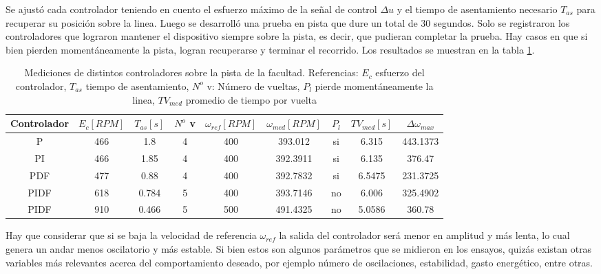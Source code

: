 \documentclass[10pt,conference,a4paper,onecolumn]{article}%
\begin{document}
Se ajustó cada controlador teniendo en cuento el esfuerzo máximo de la señal de control $\Delta u $ y el tiempo de asentamiento necesario $T_{as}$ para recuperar su posición sobre la linea. Luego se desarrolló una prueba en pista que dure un total de 30 segundos. Solo se registraron los controladores que lograron mantener el dispositivo siempre sobre la pista, es decir, que pudieran completar la prueba. Hay casos en que si bien pierden momentáneamente la pista, logran recuperarse y terminar el recorrido. Los resultados se muestran en la tabla \ref{tabla:mediciones}.   
\begin{table}[h]
\begin{center}
\begin{tabular}{|c|c|c|c|c|c|c|c|c|}
\hline
Controlador & $E_c [RPM]$ & $T_{as}[s]$ & $N^o$ v &$\omega_{ref}[RPM]$& $\omega_{med}[RPM]$ & $P_l$ & $TV_{med}[s]$ &$\Delta\omega _{max} $  \\
\hline \hline
P&466&1.8&4&400&393.012&si&6.315&443.1373\\ \hline
PI&466&1.85&4&400&392.3911&si&6.135&376.47\\ \hline
PDF&477&0.88&4&400&392.7832&si&6.5475&231.3725\\ \hline
PIDF&618&0.784&5&400&393.7146&no&6.006&325.4902\\ \hline
PIDF&910&0.466&5&500&491.4325&no&5.0586&360.78\\ \hline

\end{tabular}
\caption{Mediciones de distintos controladores sobre la pista de la facultad. Referencias: $E_c$ esfuerzo del controlador, $T_{as}$ tiempo de asentamiento, $N^o$ v: Número de vueltas, $P_l$ pierde momentáneamente la linea, $TV_{med}$ promedio de tiempo por vuelta}
\label{tabla:mediciones}
\end{center}
\end{table}


Hay que considerar que si se baja la velocidad de referencia $\omega_{ref}$ la salida del controlador será menor en amplitud y más lenta, lo cual genera un andar menos oscilatorio y más estable. 
Si bien estos son algunos parámetros que se midieron en los ensayos, quizás existan otras variables más relevantes acerca del comportamiento deseado, por ejemplo número de oscilaciones, estabilidad, gasto energético, entre otras.
\end{document}
